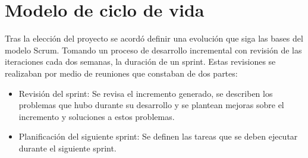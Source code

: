 \section{Modelo de ciclo de vida}

Tras la elección del proyecto se acordó definir una evolución que siga las bases del modelo Scrum. Tomando un proceso de desarrollo incremental con revisión de las iteraciones cada dos semanas, la duración de un sprint. Estas revisiones se realizaban por medio de reuniones que constaban de dos partes:
\begin{itemize}
	\item Revisión del sprint: Se revisa el incremento generado, se describen los problemas que hubo durante su desarrollo y se plantean mejoras sobre el incremento y soluciones a estos problemas.
	\item Planificación del siguiente sprint: Se definen las tareas que se deben ejecutar durante el siguiente sprint.
\end{itemize}

